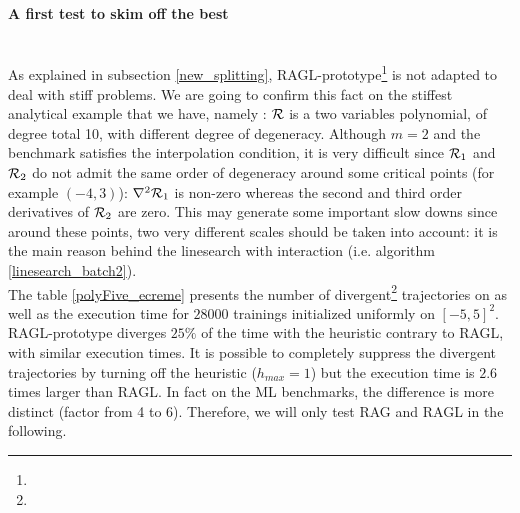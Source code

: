 \paragraph{A first test to skim off the best}
~~\\
As explained in subsection \ref{new_splitting}, RAGL-prototype\footnote{} is not adapted to deal with stiff
problems. We are going to confirm this fact on the stiffest analytical example that we have, namely \polyFive: $\mathcal{R}$ is a two variables polynomial, of degree total 10, with
different degree of degeneracy. Although $m=2$ and the benchmark satisfies the interpolation condition, it is very difficult since $\mathcal{R}_1$ and $\mathcal{R}_2$ do not admit the same order of
degeneracy around some critical points (for example $(-4,3)$): $\nabla^2 \mathcal{R}_1$ is non-zero whereas the second and third order derivatives of $\mathcal{R}_2$ are zero. This may generate some
important slow downs since around these points, two very different scales should be taken into account: it is the main reason behind the linesearch with interaction (i.e.
algorithm \ref{linesearch_batch2}). \\
The table \ref{polyFive_ecreme} presents the number of divergent\footnote{} trajectories on \polyFive as well as the execution time for $28000$ trainings initialized uniformly on $[-5,5]^2$.
RAGL-prototype diverges $25 \%$ of the time with the heuristic contrary to RAGL, with similar execution times. It is possible to completely suppress the divergent trajectories by turning off the heuristic ($h_{max}=1$) but the execution time is $2.6$ times larger than RAGL. In fact on the ML benchmarks, the difference is more distinct (factor from 4 to 6). Therefore, we will only test RAG and RAGL in the following.


